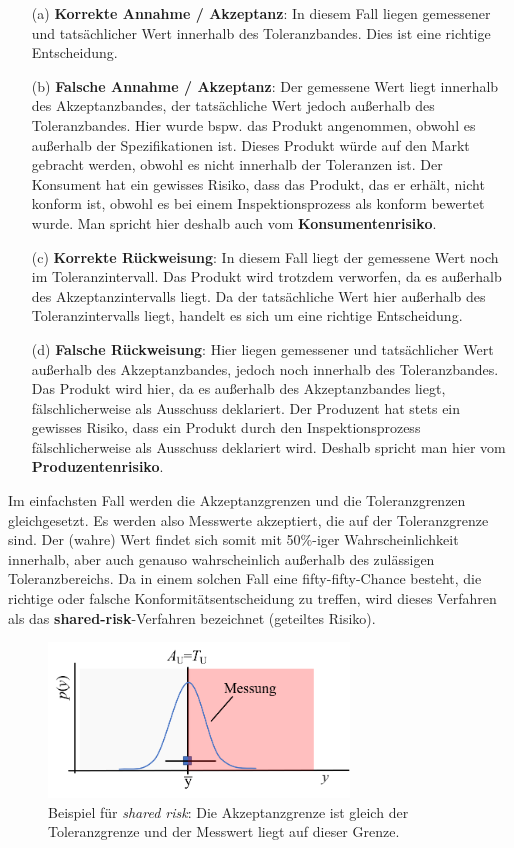 \begin{itemize}
	\item[(a)] \textbf{Korrekte Annahme / Akzeptanz}: In diesem Fall liegen gemessener und tatsächlicher Wert innerhalb des Toleranzbandes. Dies ist eine richtige Entscheidung.
	\item[(b)] 	\textbf{Falsche Annahme / Akzeptanz}: Der gemessene Wert liegt innerhalb des Akzeptanzbandes, der tatsächliche Wert jedoch außerhalb des Toleranzbandes. Hier wurde bspw. das Produkt angenommen, obwohl es außerhalb der Spezifikationen ist. Dieses Produkt würde auf den Markt gebracht werden, obwohl es nicht innerhalb der Toleranzen ist. Der Konsument hat ein gewisses Risiko, dass das Produkt, das er erhält, nicht konform ist, obwohl es bei einem Inspektionsprozess als konform bewertet wurde. Man spricht hier deshalb auch vom \textbf{Konsumentenrisiko}.
	\item[(c)] 	\textbf{Korrekte Rückweisung}: In diesem Fall liegt der gemessene Wert noch im Toleranzintervall. Das Produkt wird trotzdem verworfen, da es außerhalb des Akzeptanzintervalls liegt. Da der tatsächliche Wert hier außerhalb des Toleranzintervalls liegt, handelt es sich um eine richtige Entscheidung.
	\item[(d)] 	\textbf{Falsche Rückweisung}: Hier liegen gemessener und tatsächlicher Wert außerhalb des Akzeptanzbandes, jedoch noch innerhalb des Toleranzbandes. Das Produkt wird hier, da es außerhalb des Akzeptanzbandes liegt, fälschlicherweise als Ausschuss deklariert. Der Produzent hat stets ein gewisses Risiko, dass ein Produkt durch den Inspektionsprozess fälschlicherweise als Ausschuss deklariert wird. Deshalb spricht man hier vom \textbf{Produzentenrisiko}.
\end{itemize}
Im einfachsten Fall werden die Akzeptanzgrenzen und die Toleranzgrenzen gleichgesetzt. Es werden also Messwerte akzeptiert, die auf der Toleranzgrenze sind. Der (wahre) Wert findet sich somit mit 50\%-iger Wahrscheinlichkeit innerhalb, aber auch genauso
wahrscheinlich außerhalb des zulässigen Toleranzbereichs.
Da in einem solchen Fall eine fifty-fifty-Chance besteht, die
richtige oder falsche Konformitätsentscheidung zu treffen,
wird dieses Verfahren als das \textbf{shared-risk}-Verfahren
bezeichnet (geteiltes Risiko).

\begin{figure}[!htp]
	\begin{center}
		\includegraphics[width=80mm]{05_vorlesung/media/SharedRisk.png}
		\caption{\label{fig:shared_risk} Beispiel für \textsl{shared risk}: Die Akzeptanzgrenze ist gleich der Toleranzgrenze und der Messwert liegt auf dieser Grenze.}
	\end{center}
\end{figure}

